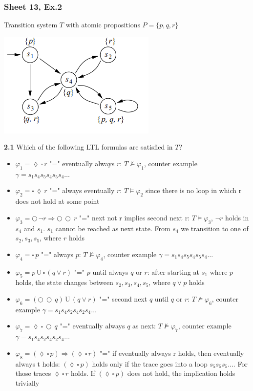 \documentclass{article}
\def\unt{\, \text{U} \,}
\def\nex{\bigcirc \,}
\def\evt{\lozenge  \,}
\def\alw{\square \,}
\begin{document}
\subsubsection{Sheet 13, Ex.2}
Transition system $T$  with atomic propositions $P=\{p,q,r\}$
\begin{center}
\includegraphics[scale=0.8]{sheet13_a2.png}
\end{center}
\textbf{2.1} Which of the following LTL formulas are satisfied in $T$?
\begin{itemize}
    \item $\varphi_1 = \evt \alw r$ "=" eventually always $r$: $T \nvDash \varphi_1$, counter example $\gamma = s_1s_4s_5s_4s_5s_4\dots$
    \item $\varphi_2 = \alw \evt r$ "=" always eventually $r$: $T \vDash \varphi_2$ since there is no loop in which r does not hold at some point 
    \item $\varphi_3 = \nex \lnot r \Rightarrow \nex \nex r$ "=" next not r implies second next r: $T \vDash \varphi_3$, $\lnot r$ holds in $s_4$ and $s_1$. $s_1$ cannot be reached as next state. From $s_4$ we transition to one of $s_2, s_3, s_5$, where $r$ holds
    \item $\varphi_4 = \alw p$ "=" always $p$: $T \nvDash \varphi_4$, counter example $\gamma = s_1s_4s_5s_4s_5s_4\dots$
    \item $\varphi_5 = p \unt \alw (q \lor r)$ "=" $p$ until always $q$ or $r$: after starting at $s_1$ where $p$ holds, the state changes between $s_2,s_3,s_4,s_5$, where $q \lor p$ holds 
    \item $\varphi_6 = (\nex \nex q) \unt (q \lor r)$ "=" second next $q$ until $q$ or $r$: $T \nvDash \varphi_6$, counter example $\gamma = s_1s_4s_2s_4s_2s_4\dots$
    \item $\varphi_7 = \evt \alw \nex q$ "=" eventually always $q$ as next: $T \nvDash \varphi_7$, counter example $\gamma = s_1s_4s_2s_4s_2s_4\dots$
    \item $\varphi_8 = (\evt \alw p) \Rightarrow  (\evt \alw r)$ "=" if eventually always r holds, then eventually always t holds: $(\evt \alw p)$ holds only if the trace goes into a loop $s_5s_5s_5\dots$. For those traces $\evt \alw r$ holds. If $(\evt \alw p)$ does not hold, the implication holds trivially
\end{itemize}
\end{document}
